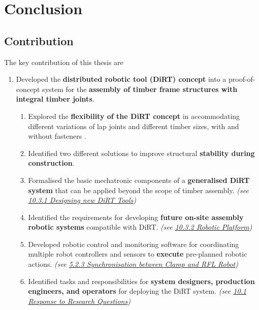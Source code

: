 \chapter{Conclusion}
\label{chapter:conclusion}

\section{Contribution}
\label{section:contribution}

The key contribution of this thesis are

\begin{enumerate}
	\item Developed the \textbf{distributed robotic tool (DiRT) concept} into a proof-of-concept system for the \textbf{assembly of timber frame structures with integral timber joints}. 
	\begin{enumerate}
		\item Explored the \textbf{flexibility of the DiRT concept} in accommodating different variations of lap joints and different timber sizes, with and without fasteners .

		\item Identified two different solutions to improve structural \textbf{stability during construction}. 

		\item Formalised the basic mechatronic components of a \textbf{generalised DiRT system} that can be applied beyond the scope of timber assembly. \textit{(see \ul{10.3.1 Designing new DiRT Tools})}

		\item Identified the requirements for developing \textbf{future on-site assembly robotic systems} compatible with DiRT.  \textit{(see \ul{10.3.2 Robotic Platform})}

		\item Developed robotic control and monitoring software for coordinating multiple robot controllers and sensors to \textbf{execute} pre-planned robotic actions. \textit{(see \ul{5.2.3 Synchronisation between Clamp and RFL Robot})}

		\item Identified tasks and responsibilities for\textbf{ system designers, production engineers, and operators} for deploying the DiRT system. \textit{(see \ul{10.1 Response to Research Questions})}


\end{enumerate}
\end{enumerate}
